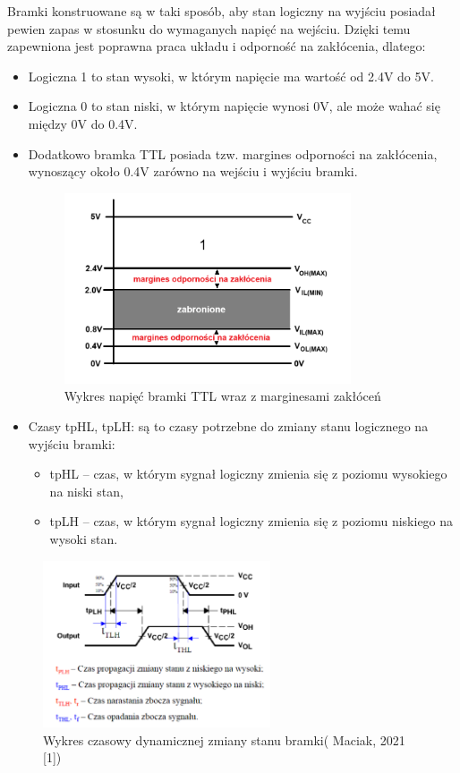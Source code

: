 \documentclass{article}
\begin{document}
    Bramki konstruowane są w taki sposób, aby stan logiczny na wyjściu posiadał pewien zapas w stosunku do wymaganych napięć na wejściu\cite{TI7400}. Dzięki temu zapewniona jest poprawna praca układu i odporność na zakłócenia, dlatego:
    \begin{itemize}
        \item Logiczna 1 to stan wysoki, w którym napięcie ma wartość od 2.4V do 5V.
        \item Logiczna 0 to stan niski, w którym napięcie wynosi 0V, ale może wahać się między 0V do 0.4V.
        \item Dodatkowo bramka TTL posiada tzw. margines odporności na zakłócenia, wynoszący około 0.4V zarówno na wejściu i wyjściu bramki.
        \begin{figure}[h]
        	\centering
        	\includegraphics[width=0.8\textwidth]{margines.PNG}
        	\caption{Wykres napięć bramki TTL wraz z marginesami zakłóceń}
        	\label{fig:moj_obrazek}
        \end{figure}
        \item Czasy tpHL, tpLH: są to czasy potrzebne do zmiany stanu logicznego na wyjściu bramki: 
        \begin{itemize}
            \item tpHL – czas, w którym sygnał logiczny zmienia się z poziomu wysokiego na niski stan,
            \item tpLH – czas, w którym sygnał logiczny zmienia się z poziomu niskiego na wysoki stan.
        \end{itemize}
    \end{itemize}
    
    \begin{figure}[h]
    	\centering
    	\includegraphics[width=0.6\textwidth]{czas.PNG}
    	\caption{Wykres czasowy dynamicznej zmiany stanu bramki( Maciak, 2021 [1])}
    	\label{fig:moj_obrazek}
    \end{figure}
\end{document}
